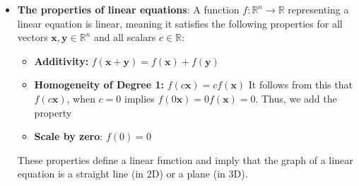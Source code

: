 \documentclass{report}
\begin{document}
    \pagebreak 
    \begin{itemize}
        \item \textbf{The properties of linear equations}:
            A function \( f: \mathbb{R}^n \rightarrow \mathbb{R} \) representing a linear equation is linear, meaning it satisfies the following properties for all vectors \( \mathbf{x}, \mathbf{y} \in \mathbb{R}^n \) and all scalars \( c \in \mathbb{R} \):
            \begin{itemize}
                \item \textbf{Additivity:} \( f(\mathbf{x} + \mathbf{y}) = f(\mathbf{x}) + f(\mathbf{y}) \)
                \item \textbf{Homogeneity of Degree 1:} \( f(c\mathbf{x}) = cf(\mathbf{x}) \)
                    \bigbreak \noindent 
                    It follows from this that $f(c\mathbf{x})$, when $c=0$ implies $f(0 \mathbf{x}) = 0 f(\mathbf{x}) = 0$. Thus, we add the property
                \item \textbf{Scale by zero}: $f(0) = 0$
            \end{itemize}
            These properties define a linear function and imply that the graph of a linear equation is a straight line (in 2D) or a plane (in 3D).
    \end{itemize}
\end{document}
